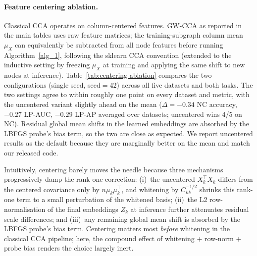 \documentclass{article}
\begin{document}
\paragraph{Feature centering ablation.}
Classical CCA operates on column-centered features. GW-CCA as reported
in the main tables uses raw feature matrices; the training-subgraph
column mean $\mu_X$ can equivalently be subtracted from all node
features before running Algorithm~\ref{alg_1}, following the sklearn
CCA convention (extended to the inductive setting by freezing $\mu_X$
at training and applying the same shift to new nodes at inference).
Table~\ref{tab:centering-ablation} compares the two configurations
(single seed, seed$=42$) across all five datasets and both tasks. The
two settings agree to within roughly one point on every dataset and
metric, with the uncentered variant slightly ahead on the mean
($\Delta = -0.34$ NC accuracy, $-0.27$ LP-AUC, $-0.29$ LP-AP averaged
over datasets; uncentered wins 4/5 on NC). Residual global mean shifts
in the learned embeddings are absorbed by the LBFGS probe's bias term,
so the two are close as expected. We report uncentered results as the
default because they are marginally better on the mean and match our
released code.

Intuitively, centering barely moves the needle because three
mechanisms progressively damp the rank-one correction:
(i)~the uncentered $X_k^\top X_k$ differs from the centered covariance
only by $n\mu_k \mu_k^\top$, and whitening by $C_{kk}^{-1/2}$ shrinks
this rank-one term to a small perturbation of the whitened basis;
(ii)~the L2 row-normalisation of the final embeddings $Z_k$ at
inference further attenuates residual scale differences; and
(iii)~any remaining global mean shift is absorbed by the LBFGS
probe's bias term. Centering matters most \emph{before} whitening in
the classical CCA pipeline; here, the compound effect of whitening +
row-norm + probe bias renders the choice largely inert.
\end{document}
